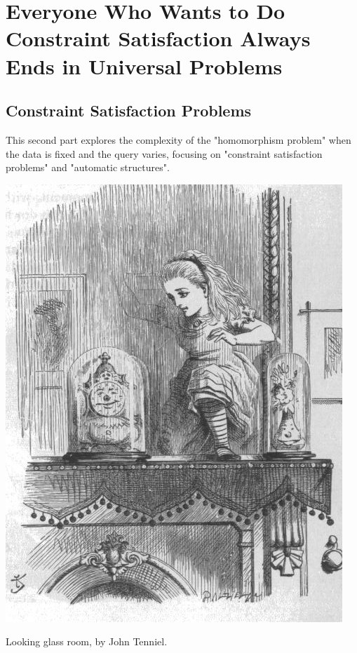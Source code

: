 \section{Everyone Who Wants to Do Constraint Satisfaction Always Ends in Universal Problems}
\label{sec:intro-universal}

\subsection{Constraint Satisfaction Problems}

This second part explores the complexity of the "homomorphism problem" when the data is fixed and the query varies, focusing on "constraint satisfaction problems" and "automatic structures".

\begin{marginfigure}
	\centering
	\includegraphics[width=\linewidth]{fig/intro/aliceroom2.jpg}
	\caption{Looking glass room, by John Tenniel.}
\end{marginfigure}

